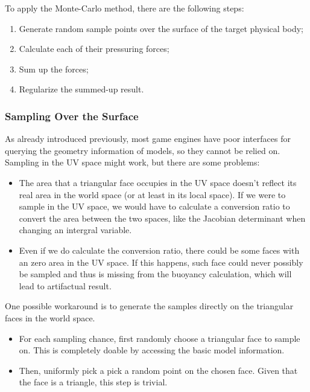To apply the Monte-Carlo method, there are the following steps:
\begin{enumerate}
	\item Generate random sample points over the surface of the target physical body;
	\item Calculate each of their pressuring forces;
	\item Sum up the forces;
	\item Regularize the summed-up result.
\end{enumerate}

\subsubsection{Sampling Over the Surface}

As already introduced previously, most game engines have poor interfaces for querying the geometry information of models, so they cannot be relied on. Sampling in the UV space might work, but there are some problems:
\begin{itemize}
	\item
		The area that a triangular face occupies in the UV space doesn't reflect its real area in the world space (or at least in its local space).
		If we were to sample in the UV space, we would have to calculate a conversion ratio to convert the area between the two spaces, like the Jacobian determinant when changing an intergral variable.
	\item Even if we do calculate the conversion ratio, there could be some faces with an zero area in the UV space.
		If this happens, such face could never possibly be sampled and thus is missing from the buoyancy calculation, which will lead to artifactual result.
\end{itemize}

One possible workaround is to generate the samples directly on the triangular faces in the world space.
\begin{itemize}
	\item For each sampling chance, first randomly choose a triangular face to sample on.
		This is completely doable by accessing the basic model information.
	\item Then, uniformly pick a pick a random point on the chosen face.
		Given that the face is a triangle, this step is trivial.
\end{itemize}

